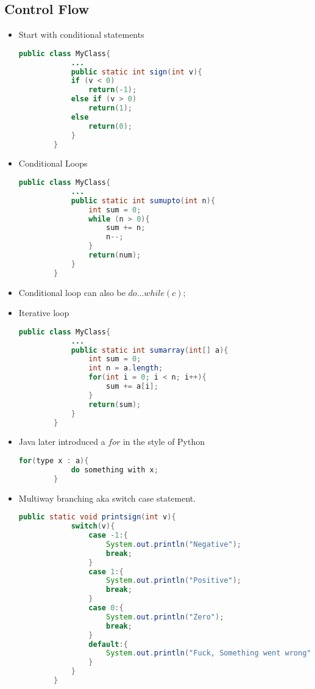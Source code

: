 \documentclass[a4paper]{article}
\begin{document}
\subsection{Control Flow}
\begin{itemize}
    \item Start with conditional statements
    \begin{lstlisting}[language=Java]
        public class MyClass{
            ...
            public static int sign(int v){
            if (v < 0)
                return(-1);
            else if (v > 0)
                return(1);
            else
                return(0);
            }
        }
    \end{lstlisting}
    \item Conditional Loops
    \begin{lstlisting}[language=Java]
        public class MyClass{
            ...
            public static int sumupto(int n){
                int sum = 0;
                while (n > 0){
                    sum += n;
                    n--;
                }
                return(num);
            }
        }
    \end{lstlisting}
    \item Conditional loop can also be $do{...}while(c);$
    \item Iterative loop
    \begin{lstlisting}[language=Java]
        public class MyClass{
            ...
            public static int sumarray(int[] a){
                int sum = 0;
                int n = a.length;
                for(int i = 0; i < n; i++){
                    sum += a[i];
                }
                return(sum);
            }
        }
    \end{lstlisting}
    \item Java later introduced a $for$ in the style of Python
    \begin{lstlisting}[language=Java]
        for(type x : a){
            do something with x;
        }
    \end{lstlisting}
    \item Multiway branching aka switch case statement.
    \begin{lstlisting}[language=Java]
        public static void printsign(int v){
            switch(v){
                case -1:{
                    System.out.println("Negative");
                    break;
                }
                case 1:{
                    System.out.println("Positive");
                    break;
                }
                case 0:{
                    System.out.println("Zero");
                    break;
                }
                default:{
                    System.out.println("Fuck, Something went wrong");
                }
            }
        }
    \end{lstlisting}
\end{itemize}
\end{document}
